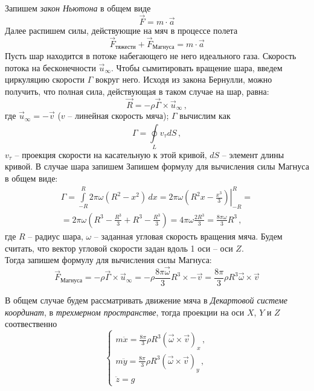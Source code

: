 \documentclass[a5paper, 10pt]{article}
\theoremstyle{definition}
\theoremstyle{plain}
\theoremstyle{remark}
\begin{document}
Запишем \textit{закон Ньютона} в общем виде
\begin{equation}
\vec{F} = m \cdot \vec{a}
\end{equation}
Далее распишем силы, действующие на мяч в процессе полета
\begin{equation}
\vec{F}_{\text{тяжести}} + \vec{F}_{\text{Магнуса}}= m \cdot \vec{a}
\end{equation}
Пусть шар находится в потоке набегающего не него идеального газа. Скорость потока на бесконечности $\vec{u}_\infty$. Чтобы сымитировать вращение шара, введем циркуляцию скорости $\Gamma$ вокруг него. Исходя из закона Бернулли, можно получить, что полная сила, действующая в таком случае на шар, равна:
\begin{equation}
\vec{R}= - \rho \vec{\Gamma} \times \vec{u}_\infty \, ,
\end{equation}
где $ \vec{u}_\infty = -\vec{v}$ ($v$ -- линейная скорость мяча);  $\Gamma$ вычислим как
\begin{equation}
\Gamma = \oint \limits^{}_L v_\tau dS \, ,
\end{equation}
$ v_\tau$ -- проекция скорости на касательную к этой кривой, $dS$ -- элемент длины кривой. В случае шара запишем
Запишем формулу для вычисления силы Магнуса в общем виде:
\begin{multline}
\Gamma = \int \limits^R_{-R} 2 \pi \omega (R^2 - x^2) \, dx = 2 \pi \omega \left. \left( R^2x - \frac{x^3}{3}\right)\right|^R_{-R} =\\
=  2 \pi \omega  \left( R^3 - \frac{R^3}{3} +  R^3 - \frac{R^3}{3} \right) = 4 \pi \omega \frac{2 R^3 }{3} = \frac{8 \pi \omega}{3}  R^3  \, ,
\end{multline}
где $R$ -- радиус шара, $\omega$ -- заданная угловая скорость вращения мяча. Будем считать, что вектор угловой скорости задан вдоль 1 оси -- оси $Z$.\\
Тогда запишем формулу для вычисления силы Магнуса:
\begin{equation}
\vec{F}_{\text{Магнуса}} = - \rho \vec{\Gamma} \times \vec{u}_\infty = - \rho  \frac{8 \pi \vec{\omega} }{3}  R^3  \times -\vec{v} = \frac{8 \pi }{3} \rho R^3 \vec{\omega} \times \vec{v}  
\end{equation}

В общем случае будем рассматривать движение мяча в \textit{Декартовой системе координат}, в \textit{трехмерном пространстве}, тогда проекции на оси $X$, $Y$ и $Z$ соотвественно
\begin{equation}
\begin{cases}
 m \ddot{x} =  \frac{8 \pi }{3} \rho R^3 \left( \vec{\omega} \times  \vec{v} \right)_{x} \, ,\\
 m \ddot{y} = \frac{8 \pi }{3} \rho R^3 \left( \vec{\omega} \times  \vec{v} \right)_{y} \, ,\\
 \ddot{z} = g
\end{cases}
\end{equation}
\end{document}
